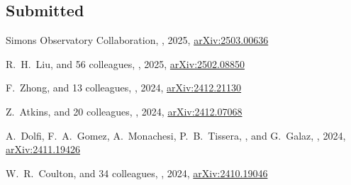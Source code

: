 

\subsection*{Submitted}

\begin{etaremune}

\item
Simons Observatory Collaboration,
,
2025, \href{https://ui.adsabs.harvard.edu/abs/2025arXiv250300636A}{arXiv:2503.00636}
\submitted{\jcap}

\item
R.~H.~Liu, and 56 colleagues,
,
2025, \href{https://ui.adsabs.harvard.edu/abs/2025arXiv250208850L}{arXiv:2502.08850}
\submitted{\prd}

\item
F.~Zhong, and 13 colleagues,
,
2024, \href{https://ui.adsabs.harvard.edu/abs/2024arXiv241221130Z}{arXiv:2412.21130}
\submitted{\mnras}

\item
Z.~Atkins, and 20 colleagues,
,
2024, \href{https://ui.adsabs.harvard.edu/abs/2024arXiv241207068A}{arXiv:2412.07068}
\submitted{\jcap}
    
\item
A.~Dolfi, F.~A.~Gomez, A.~Monachesi, P.~B.~Tissera, \myself, and G.~Galaz,
,
2024, \href{https://ui.adsabs.harvard.edu/abs/2024arXiv241119426D}{arXiv:2411.19426}
\submitted{\mnras}
    
\item
W.~R.~Coulton, and 34 colleagues,
,
2024, \href{https://ui.adsabs.harvard.edu/abs/2024arXiv241019046C}{arXiv:2410.19046}
\submitted{\prd}


\end{etaremune}
